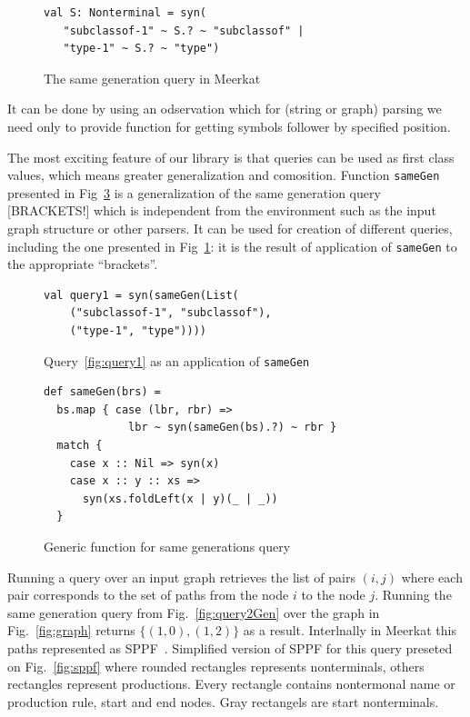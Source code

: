 \begin{figure}[h]
\begin{lstlisting}
val S: Nonterminal = syn(
   "subclassof-1" ~ S.? ~ "subclassof" |
   "type-1" ~ S.? ~ "type")
\end{lstlisting}
\caption{The same generation query in Meerkat}
\label{fig:query1Meerkat}
\end{figure}


It can be done by using an odservation which for (string or graph) parsing we need only to provide function for getting symbols follower by specified position.

The most exciting feature of our library is that queries can be used as first class values, which means greater generalization and comosition. 
Function \lstinline{sameGen} presented in Fig~\ref{fig:gen} is a generalization of the same generation query [BRACKETS!] which is independent from the environment such as the input graph structure or other parsers. It can be used for creation of different queries, including the one presented in Fig~\ref{fig:query1Meerkat}: it is the result of application of \lstinline{sameGen} to the appropriate ``brackets''.

\begin{figure}[h]
\begin{lstlisting}
val query1 = syn(sameGen(List(
    ("subclassof-1", "subclassof"),
    ("type-1", "type"))))
\end{lstlisting}
\caption{Query~\ref{fig:query1} as an application of \lstinline{sameGen}}
\label{fig:query1Gen}
\end{figure}

\begin{figure}[h]
\begin{lstlisting}
def sameGen(brs) =
  bs.map { case (lbr, rbr) => 
             lbr ~ syn(sameGen(bs).?) ~ rbr } 
  match {
    case x :: Nil => syn(x)
    case x :: y :: xs => 
      syn(xs.foldLeft(x | y)(_ | _))
  }
\end{lstlisting}
\caption{Generic function for same generations query}
\label{fig:gen}
\end{figure}

Running a query over an input graph retrieves the list of pairs $(i, j)$ where each pair corresponds to the set of paths from the node $i$ to the node $j$. Running the same generation query from Fig.~\ref{fig:query2Gen} over the graph in Fig.~\ref{fig:graph} returns  $\{(1,0), (1,2)\}$ as a result. Interlnally in Meerkat this paths represented as SPPF~\cite{SPPF}. Simplified version of SPPF for this query preseted on Fig.~\ref{fig:sppf} where rounded rectangles represents nonterminals, others rectangles represent productions. Every rectangle contains  nontermonal name or production rule, start and end nodes. Gray rectangels are start nonterminals.

